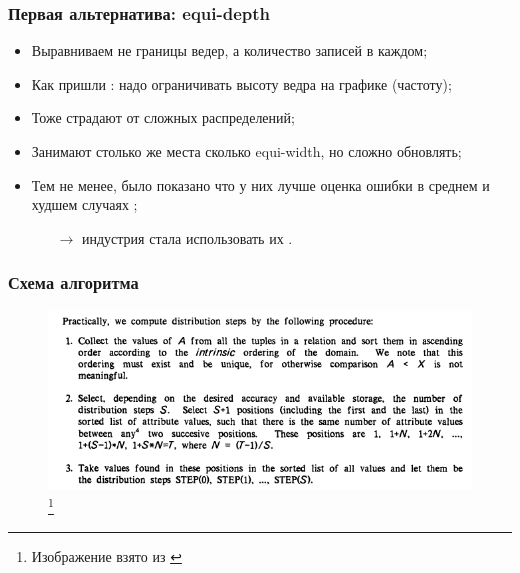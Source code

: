 \documentclass{beamer}
\begin{document}
\begin{frame}
\frametitle{Первая альтернатива: equi-depth \cite{Kooi1980} \cite{Piatetsky-Shapiro1984}}

\begin{itemize}
  \setlength\itemsep{1em}
  \item Выравниваем не границы ведер, а количество записей в каждом;  
  \item Как пришли \cite{Piatetsky-Shapiro1984}: надо ограничивать высоту ведра на графике (частоту);  
  \item Тоже страдают от сложных распределений;
  \item Занимают столько же места сколько equi-width, но сложно обновлять;
  \item Тем не менее, было показано что у них лучше оценка ошибки в среднем и худшем случаях \cite{Ioannidis1995};
  \begin{itemize}
    \item[$\longrightarrow$] индустрия стала использовать их \cite{Ioannidis2003}.
  \end{itemize}      
\end{itemize}
\end{frame}

\begin{frame}
\frametitle{Схема алгоритма}

\begin{figure}[htb]
\includegraphics[width=\textwidth,height=0.79\textheight,keepaspectratio]{shapiro-algorithm.png} 
\footnote{\tiny{Изображение взято из \cite{Piatetsky-Shapiro1984}}}
\end{figure}

\end{frame}
\end{document}
